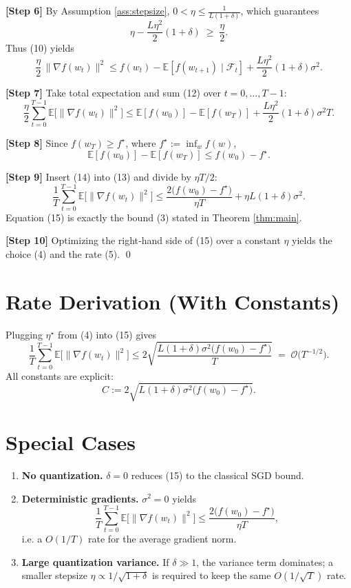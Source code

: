 \documentclass{article}
\begin{document}
\noindent\textbf{[Step 6]} By Assumption \ref{ass:stepsize}, $0<\eta\le\frac{1}{L(1+\delta)}$, which guarantees
\[
\eta-\frac{L\eta^2}{2}(1+\delta)\;\ge\;\frac{\eta}{2}.
\tag{11}
\]
Thus (10) yields
\[
\frac{\eta}{2}\,\|\nabla f(w_t)\|^2
\le f(w_t)-\mathbb{E}[f(w_{t+1})\mid\mathcal{F}_t]
   +\frac{L\eta^2}{2}(1+\delta)\sigma^2 .
\tag{12}
\]

\noindent\textbf{[Step 7]} Take total expectation and sum (12) over $t=0,\dots,T-1$:
\[
\frac{\eta}{2}\sum_{t=0}^{T-1}\mathbb{E}\!\bigl[\|\nabla f(w_t)\|^2\bigr]
\le \mathbb{E}[f(w_0)]-\mathbb{E}[f(w_T)]
   +\frac{L\eta^2}{2}(1+\delta)\sigma^2 T .
\tag{13}
\]

\noindent\textbf{[Step 8]} Since $f(w_T)\ge f^\star$, where $f^\star:=\inf_w f(w)$,
\[
\mathbb{E}[f(w_0)]-\mathbb{E}[f(w_T)]\le f(w_0)-f^\star .
\tag{14}
\]

\noindent\textbf{[Step 9]} Insert (14) into (13) and divide by $\eta T/2$:
\[
\frac{1}{T}\sum_{t=0}^{T-1}\mathbb{E}\!\bigl[\|\nabla f(w_t)\|^2\bigr]
\le \frac{2\bigl(f(w_0)-f^\star\bigr)}{\eta T}
   +\eta L(1+\delta)\sigma^2 .
\tag{15}
\]
Equation (15) is exactly the bound (3) stated in Theorem \ref{thm:main}.

\noindent\textbf{[Step 10]} Optimizing the right‑hand side of (15) over a constant $\eta$ yields the choice (4) and the rate (5). \qed

\section*{Rate Derivation (With Constants)}
Plugging $\eta^\star$ from (4) into (15) gives
\[
\frac{1}{T}\sum_{t=0}^{T-1}\mathbb{E}\!\bigl[\|\nabla f(w_t)\|^2\bigr]
\le 
2\sqrt{\frac{L(1+\delta)\sigma^2\bigl(f(w_0)-f^\star\bigr)}{T}}
\;=\;
\mathcal{O}\!\bigl(T^{-1/2}\bigr).
\]
All constants are explicit:
\[
C:=2\sqrt{L(1+\delta)\sigma^2\bigl(f(w_0)-f^\star\bigr)} .
\]

\section*{Special Cases}
\begin{enumerate}[label=\arabic*.]
\item \textbf{No quantization.} $\delta=0$ reduces (15) to the classical SGD bound.
\item \textbf{Deterministic gradients.} $\sigma^2=0$ yields
\[
\frac{1}{T}\sum_{t=0}^{T-1}\mathbb{E}\!\bigl[\|\nabla f(w_t)\|^2\bigr]
\le \frac{2\bigl(f(w_0)-f^\star\bigr)}{\eta T},
\]
i.e. a $O(1/T)$ rate for the average gradient norm.
\item \textbf{Large quantization variance.} If $\delta\gg1$, the variance term dominates; a smaller stepsize $\eta\propto 1/\sqrt{1+\delta}$ is required to keep the same $O(1/\sqrt{T})$ rate.
\end{enumerate}
\end{document}

